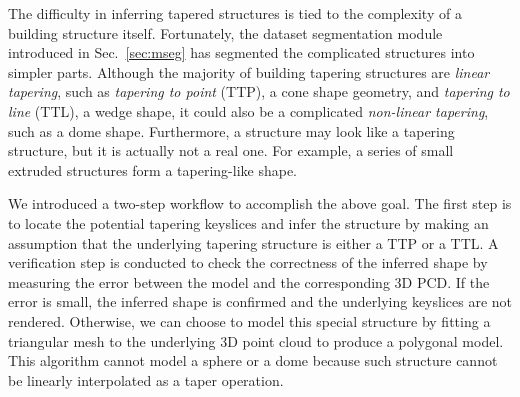 \documentclass[10pt,journal,cspaper,compsoc]{IEEEtran}
\newcommand{\Sec}[1]{Sec.~\ref{sec:#1}}
\newcommand{\Figa}[1]{Fig.~\ref{fig:#1}(a)}
\newcommand{\Figb}[1]{Fig.~\ref{fig:#1}(b)}
\newcommand{\Figc}[1]{Fig.~\ref{fig:#1}(c)}
\newcommand{\Figd}[1]{Fig.~\ref{fig:#1}(d)}
\begin{document}
The difficulty in inferring tapered structures is tied to 
the complexity of a building structure itself.
Fortunately, the dataset segmentation module introduced in \Sec{mseg} 
has segmented the complicated structures into simpler parts.
Although the majority of building tapering structures are {\it linear tapering},
such as {\it tapering to point} (TTP), a cone shape geometry,
and {\it tapering to line} (TTL), a wedge shape,
it could also be a complicated {\it non-linear tapering},
such as a dome shape.
Furthermore, a structure may look like a tapering structure,
but it is actually not a real one.
For example, a series of small extruded structures
form a tapering-like shape.

We introduced a two-step workflow to accomplish the above goal.
The first step is to locate the potential tapering keyslices
and infer the structure by making an assumption that
the underlying tapering structure is either a TTP or a TTL.
A verification step is conducted to check the correctness
of the inferred shape by measuring the error between the model and
the corresponding 3D PCD.
If the error is small, the inferred shape is confirmed
and the underlying keyslices are not rendered.
Otherwise, we can choose to model this special structure by fitting a
triangular mesh to the underlying 3D point cloud to produce a polygonal model.
This algorithm cannot model a sphere or a dome because such structure
cannot be linearly interpolated as a taper operation.
\end{document}
